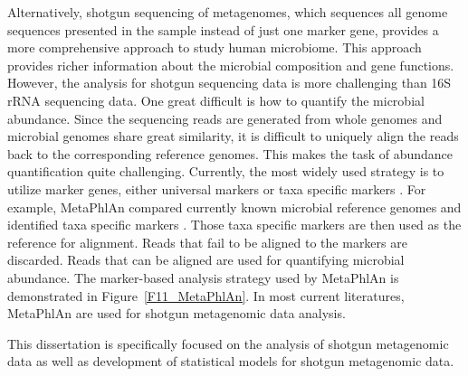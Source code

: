 Alternatively, shotgun sequencing of metagenomes, which sequences all genome sequences presented in the sample instead of just one marker gene, provides a more comprehensive approach to study human microbiome. This approach provides richer information about the microbial composition and gene functions. However, the analysis for shotgun sequencing data is more challenging than 16S rRNA sequencing data. One great difficult is how to quantify the microbial abundance. Since the sequencing reads are generated from whole genomes and microbial genomes share great similarity, it is difficult to uniquely align the reads back to the corresponding reference genomes. This makes the task of abundance quantification quite challenging. Currently, the most widely used strategy is to utilize  marker genes, either universal  markers \citep{Sunagawa:2013if} or taxa specific markers \citep{segata2012metagenomic}. For example, MetaPhlAn compared currently known microbial reference genomes and identified taxa specific markers \citep{segata2012metagenomic}. Those taxa specific markers are then used as the reference for alignment. Reads that fail to be aligned to the markers are discarded. Reads that can be aligned are used for quantifying microbial abundance. The marker-based analysis strategy used by MetaPhlAn is demonstrated in Figure~\ref{F11_MetaPhlAn}. In most current literatures, MetaPhlAn are used for shotgun metagenomic data analysis.



This dissertation is specifically focused on the analysis of shotgun metagenomic data as well as development of statistical models for shotgun metagenomic data. 


